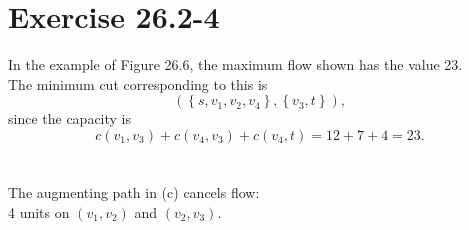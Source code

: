 \section*{Exercise 26.2-4}
In the example of Figure 26.6, the maximum flow shown has the value 23.
\\
The minimum cut corresponding to this is
$$
(\left\{s,v_1,v_2,v_4\right\}, \left\{v_3,t\right\}),
$$
since the capacity is
$$
c(v_1,v_3) + c(v_4,v_3) + c(v_4,t) = 12+7+4 = 23.
$$
\\
\\
The augmenting path in (c) cancels flow:
\\
4 units on $(v_1, v_2)$ and $(v_2,v_3)$.